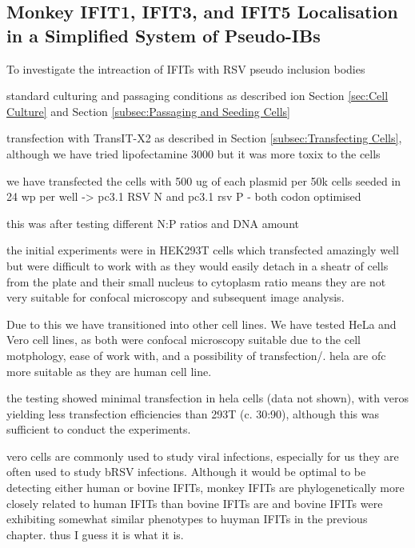 \subsection{Monkey IFIT1, IFIT3, and IFIT5 Localisation in a Simplified System of Pseudo-IBs} \label{subsec:Monkey IFIT1, IFIT3, and IFIT5 Localisation in a Simplified System of Pseudo-IBs}


To investigate the intreaction of IFITs with RSV pseudo inclusion bodies

standard culturing and passaging conditions as described ion Section \ref{sec:Cell Culture} and Section \ref{subsec:Passaging and Seeding Cells}


transfection with TransIT-X2 as described in Section \ref{subsec:Transfecting Cells}, although we have tried lipofectamine 3000 but it was more toxix to the cells

we have transfected the cells with 500 ug of each plasmid per 50k cells seeded in 24 wp per well -> pc3.1 RSV N and pc3.1 rsv P - both codon optimised

this was after testing different N:P ratios and DNA amount

the initial experiments were in HEK293T cells which transfected amazingly well but were difficult to work with as they would easily detach in a sheatr of cells from the plate and their small nucleus to cytoplasm ratio means they are not very suitable for confocal microscopy and subsequent image analysis. 

Due to this we have transitioned into other cell lines. We have tested HeLa and Vero cell lines, as both were confocal microscopy suitable due to the cell motphology, ease of work with, and a possibility of transfection/. hela are ofc more suitable as they are human cell line.

the testing showed minimal transfection in hela cells (data not shown), with veros yielding less transfection efficiencies than 293T (c. 30:90), although this was sufficient to conduct the experiments.

vero cells are commonly used to study viral infections, especially for us they are often used to study bRSV infections. Although it would be optimal to be detecting either human or bovine IFITs, monkey IFITs are phylogenetically more closely related to human IFITs than bovine IFITs are and bovine IFITs were exhibiting somewhat similar phenotypes to huyman IFITs in the previous chapter. thus I guess it is what it is.



